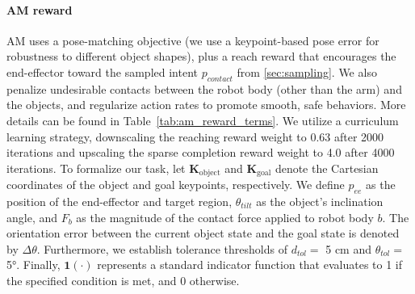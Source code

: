 \paragraph{AM reward}
AM uses a pose-matching objective (we use a keypoint-based pose error \cite{Jeon2023WholeBodyQuadruped} for robustness to different object shapes), plus a reach reward that encourages the end-effector toward the sampled intent $p_{contact}$ from \ref{sec:sampling}. We also penalize undesirable contacts between the robot body (other than the arm) and the objects, and regularize action rates to promote smooth, safe behaviors. More details can be found in Table~\ref{tab:am_reward_terms}. We utilize a curriculum learning strategy, downscaling the reaching reward weight to 0.63 after 2000 iterations and upscaling the sparse completion reward weight to 4.0 after 4000 iterations. To formalize our task, let $\mathbf{K}_{\text{object}}$ and $\mathbf{K}_{\text{goal}}$ denote the Cartesian coordinates of the object and goal keypoints, respectively. We define $p_{ee}$ as the position of the end-effector and target region, $\theta_{tilt}$ as the object's inclination angle, and $F_b$ as the magnitude of the contact force applied to robot body $b$. The orientation error between the current object state and the goal state is denoted by $\Delta\theta$. Furthermore, we establish tolerance thresholds of $d_{tol} =$ 5 cm and $\theta_{tol} =$ 5°. Finally, $\mathbf{1}(\cdot)$ represents a standard indicator function that evaluates to 1 if the specified condition is met, and 0 otherwise.


